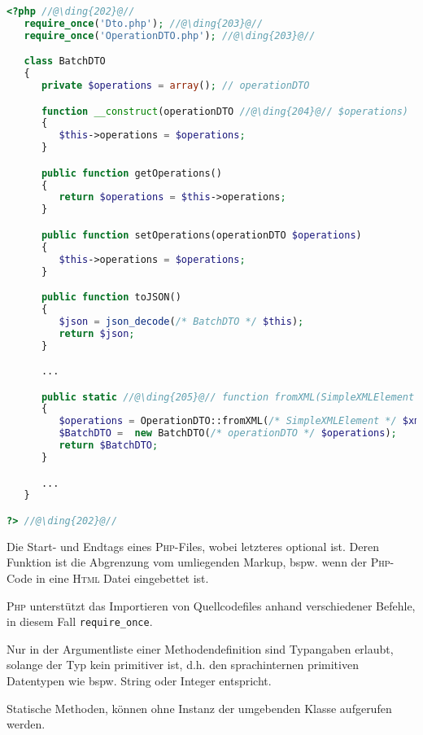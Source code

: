 \begin{lstlisting}[language=php, caption=Durch den Generator erzeugte Batch\textsc{DTO} Datenklasse der Spreadshirt-\textsc{API} als Beispiel für eine \textsc{PHP}-Datei]
<?php //@\ding{202}@//
   require_once('Dto.php'); //@\ding{203}@//
   require_once('OperationDTO.php'); //@\ding{203}@//

   class BatchDTO
   {
      private $operations = array(); // operationDTO 

      function __construct(operationDTO //@\ding{204}@// $operations) 
      {
         $this->operations = $operations;
      }

      public function getOperations()
      {
         return $operations = $this->operations;
      }

      public function setOperations(operationDTO $operations)
      {
         $this->operations = $operations;
      }

      public function toJSON()
      {
         $json = json_decode(/* BatchDTO */ $this);
         return $json;
      }

      ...

      public static //@\ding{205}@// function fromXML(SimpleXMLElement $xml)
      {
         $operations = OperationDTO::fromXML(/* SimpleXMLElement */ $xml->operations);
         $BatchDTO =  new BatchDTO(/* operationDTO */ $operations);
         return $BatchDTO;
      }

      ...
   }

?> //@\ding{202}@//
\end{lstlisting}

\begin{compactitem}
    \item[\ding{202}] Die Start- und Endtags eines \textsc{Php}-Files, wobei letzteres optional ist. Deren Funktion ist die Abgrenzung vom umliegenden Markup, bspw. wenn der \textsc{Php}-Code in eine \textsc{Html} Datei eingebettet ist.
    \item[\ding{203}] \textsc{Php} unterstützt das Importieren von Quellcodefiles anhand verschiedener Befehle, in diesem Fall \texttt{require\_once}.
    \item[\ding{204}] Nur in der Argumentliste einer Methodendefinition sind Typangaben erlaubt, solange der Typ kein primitiver ist, d.h. den sprachinternen primitiven Datentypen wie bspw. String oder Integer entspricht. 
    \item[\ding{205}] Statische Methoden, können ohne Instanz der umgebenden Klasse aufgerufen werden.
\end{compactitem}
